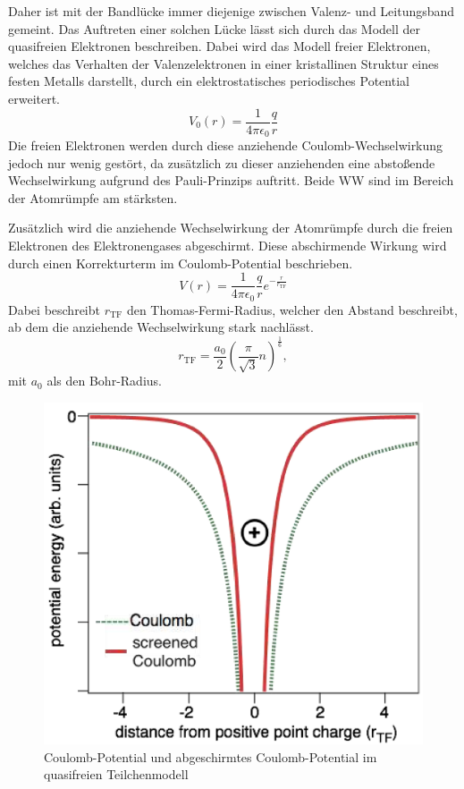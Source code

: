 Daher ist mit der Bandlücke immer diejenige zwischen Valenz- und Leitungsband gemeint.
Das Auftreten einer solchen Lücke lässt sich durch das Modell der quasifreien Elektronen beschreiben. Dabei wird das Modell freier Elektronen, welches das Verhalten der Valenzelektronen in einer kristallinen Struktur eines festen Metalls darstellt, durch ein elektrostatisches periodisches Potential
erweitert.
\begin{equation}
    \label{eq:coulomb_potential}
    V_0(r) = \frac{1}{4\pi\epsilon_0}\frac{q}{r}
\end{equation}
Die freien Elektronen werden durch diese anziehende Coulomb-Wechselwirkung jedoch nur wenig gestört, da zusätzlich zu dieser anziehenden eine abstoßende Wechselwirkung aufgrund des Pauli-Prinzips auftritt. Beide WW sind im Bereich der Atomrümpfe am stärksten.

Zusätzlich wird die anziehende Wechselwirkung der Atomrümpfe durch die freien Elektronen des Elektronengases abgeschirmt. Diese abschirmende Wirkung wird durch einen Korrekturterm im Coulomb-Potential beschrieben.
\begin{equation}
    \label{eq:}
    V(r) = \frac{1}{4\pi\epsilon_0}\frac{q}{r}e^{-\frac{r}{r_{\text{TF}}}}
\end{equation}
Dabei beschreibt $r_{\text{TF}}$ den Thomas-Fermi-Radius, welcher den Abstand beschreibt, ab dem die anziehende Wechselwirkung stark nachlässt.
\begin{equation}
    \label{eq:Thomas-Fermi-Radius}
    r_{\text{TF}} = \frac{a_0}{2}\left(\frac{\pi}{\sqrt{3}}n\right)^{\frac{1}{6}},
\end{equation}
mit $a_0$ als den Bohr-Radius.

\begin{figure}[H]
    \centering
    \begin{samepage}
        \includegraphics[width=0.6\linewidth]{resources/05-01-2015/coulomb_potential_screened.png}
        \caption{Coulomb-Potential und abgeschirmtes Coulomb-Potential im quasifreien Teilchenmodell}
        \label{fig:coulomb_potential_with_and_without_screening}
    \end{samepage}
\end{figure}

